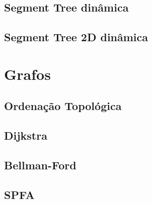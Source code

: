 \subsection{Segment Tree dinâmica}


\subsection{Segment Tree 2D dinâmica}


% 

% 

% 


\section{Grafos}

\subsection{Ordenação Topológica}


\subsection{Dijkstra}


\subsection{Bellman-Ford}


\subsection{SPFA}


